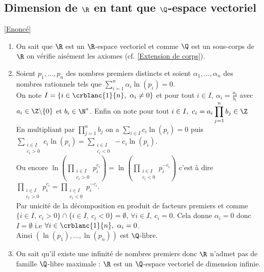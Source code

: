 \documentclass[8pt]{book}
\begin{document}
\subsection{Dimension de $\R$ en tant que $\Q$-espace vectoriel }
\label{Dimension de R en tant que Q espace vectoriel corrigé}
\textcolor{blue}{\hyperref[Dimension de R en tant que Q espace vectoriel ]{[Enoncé]}}\\
	\begin{enumerate}[leftmargin=*]
		\item On sait que $\R$ est un $\R$-espace vectoriel et comme $\Q$ est un sous-corps de $\R$ on vérifie aisément les axiomes (cf. \ref{Extension de corps}).
		\item Soient $p_1,\dots,p_n$ des nombres premiers distincts et soient $\alpha_1,\dots,\alpha_n$ des nombres rationnels tels que $\displaystyle\sum_{i=1}^n\alpha_i\ln(p_i)=0$.\\
		On note $I=\{i\in \crblanc{1}{n},\ \alpha_i\ne 0\}$ et pour tout $i\in I,\ \alpha_i=\displaystyle\frac{a_i}{b_i}$ avec $a_i\in \Z\backslash\{0\}$ et $b_i\in \N^*$. Enfin on note pour tout $i\in I,\ c_i=a_i\displaystyle\prod_{j=1}^nb_j\in \Z$\\
		En multipliant par $\displaystyle\prod_{j=1}^nb_j$ on a $\displaystyle\sum_{i\in I}c_i\ln(p_i)=0$ puis $\displaystyle\sum_{\substack{i\in I\\c_i>0}}c_i\ln(p_i)=\sum_{\substack{i\in I\\c_i<0}}-c_i\ln(p_i)$.\\
		Ou encore $\displaystyle\ln\left(\prod_{\substack{i\in I\\c_i>0}}p_i^{c_i}\right)=\ln\left(\prod_{\substack{i\in I\\c_i<0}}p_i^{-c_i}\right)$ c'est à dire $\displaystyle\prod_{\substack{i\in I\\c_i>0}}p_i^{c_i}=\prod_{\substack{i\in I\\c_i<0}}p_i^{-c_i}$.\\
		Par unicité de la décomposition en produit de facteurs premiers et comme $\{i\in I,\ c_i>0\}\cap\{i\in I,\ c_i<0\}=\emptyset$, $\forall i\in I,\ c_i=0$. Cela donne $\alpha_i=0$ donc $I=\emptyset$ i.e $\forall i\in \crblanc{1}{n},\ \alpha_i=0$.\\
		Ainsi $(\ln(p_1),\dots,\ln(p_n))$ est $\Q$-libre.
		\item On sait qu'il existe une infinité de nombres premiers donc $\R$ n'admet pas de famille $\Q$-libre maximale : $\R$ est un $\Q$-espace vectoriel de dimension infinie.
	\end{enumerate}
	
\end{document}
